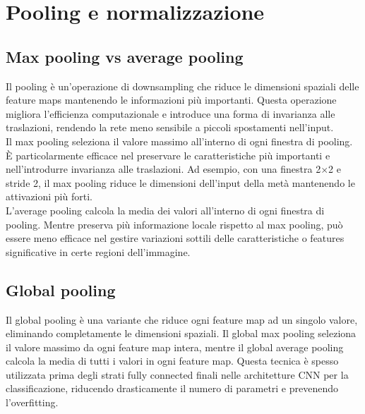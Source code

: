 \documentclass[a4paper,12pt]{report}
\begin{document}
		\section{Pooling e normalizzazione}
	
	\subsection{Max pooling vs average pooling}
	Il pooling è un'operazione di downsampling che riduce le dimensioni spaziali delle feature maps mantenendo le informazioni più importanti. Questa operazione migliora l'efficienza computazionale e introduce una forma di invarianza alle traslazioni, rendendo la rete meno sensibile a piccoli spostamenti nell'input. \\
	Il max pooling seleziona il valore massimo all'interno di ogni finestra di pooling. È particolarmente efficace nel preservare le caratteristiche più importanti e nell'introdurre invarianza alle traslazioni. Ad esempio, con una finestra 2$\times$2 e stride 2, il max pooling riduce le dimensioni dell'input della metà mantenendo le attivazioni più forti. \\
	L'average pooling calcola la media dei valori all'interno di ogni finestra di pooling. Mentre preserva più informazione locale rispetto al max pooling, può essere meno efficace nel gestire variazioni sottili delle caratteristiche o features significative in certe regioni dell'immagine.
	
	\subsection{Global pooling}
	
	Il global pooling è una variante che riduce ogni feature map ad un singolo valore, eliminando completamente le dimensioni spaziali. Il global max pooling seleziona il valore massimo da ogni feature map intera, mentre il global average pooling calcola la media di tutti i valori in ogni feature map. Questa tecnica è spesso utilizzata prima degli strati fully connected finali nelle architetture CNN per la classificazione, riducendo drasticamente il numero di parametri e prevenendo l'overfitting.
	
\end{document}
